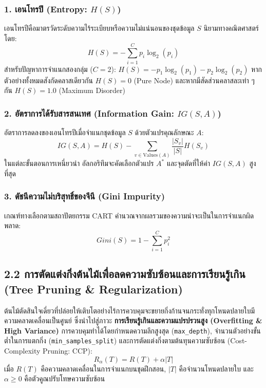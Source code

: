 \documentclass[12pt,a4paper]{article}
\begin{document}
\subsubsection*{1. เอนโทรปี (Entropy: $H(S)$)}
เอนโทรปีคือมาตรวัดระดับความไร้ระเบียบหรือความไม่แน่นอนของชุดข้อมูล $S$ นิยามทางคณิตศาสตร์โดย:
\begin{equation}
    H(S) = -\sum_{i=1}^{C} p_i \log_2(p_i)
\end{equation}
สำหรับปัญหาการจำแนกสองกลุ่ม ($C = 2$): $H(S) = -p_1 \log_2(p_1) - p_2 \log_2(p_2)$ หากตัวอย่างทั้งหมดสังกัดคลาสเดียวกัน $H(S) = 0$ (Pure Node) และหากมีสัดส่วนคลาสละเท่า ๆ กัน $H(S) = 1.0$ (Maximum Disorder)

\subsubsection*{2. อัตราการได้รับสารสนเทศ (Information Gain: $IG(S, A)$)}
อัตราการลดลงของเอนโทรปีเมื่อจำแนกชุดข้อมูล $S$ ด้วยตัวแปรคุณลักษณะ $A$:
\begin{equation}
    IG(S, A) = H(S) - \sum_{v \in \text{Values}(A)} \frac{|S_v|}{|S|} H(S_v)
\end{equation}
ในแต่ละขั้นตอนการเหนี่ยวนำ อัลกอริทึมจะคัดเลือกตัวแปร $A^*$ และจุดตัดที่ให้ค่า $IG(S, A)$ สูงที่สุด

\subsubsection*{3. ดัชนีความไม่บริสุทธิ์ของจีนี (Gini Impurity)}
เกณฑ์ทางเลือกตามสถาปัตยกรรม CART คำนวณจากผลรวมของความน่าจะเป็นในการจำแนกผิดพลาด:
\begin{equation}
    Gini(S) = 1 - \sum_{i=1}^{C} p_i^2
\end{equation}

\subsection*{2.2 การตัดแต่งกิ่งต้นไม้เพื่อลดความซับซ้อนและการเรียนรู้เกิน\\ \normalsize(Tree Pruning \& Regularization)}
ต้นไม้ตัดสินใจเดี่ยวที่ปล่อยให้เติบโตอย่างไร้การควบคุมจะขยายกิ่งก้านจนกระทั่งทุกโหนดปลายใบมีความคลาดเคลื่อนเป็นศูนย์ ซึ่งนำไปสู่ภาวะ \textbf{การเรียนรู้เกินและความแปรปรวนสูง (Overfitting \& High Variance)} การควบคุมทำได้โดยกำหนดความลึกสูงสุด (\texttt{max\_depth}), จำนวนตัวอย่างขั้นต่ำในการแตกกิ่ง (\texttt{min\_samples\_split}) และการตัดแต่งกิ่งตามต้นทุนความซับซ้อน (Cost-Complexity Pruning: CCP):
\begin{equation}
    R_\alpha(T) = R(T) + \alpha |T|
\end{equation}
เมื่อ $R(T)$ คือความคลาดเคลื่อนในการจำแนกบนชุดฝึกสอน, $|T|$ คือจำนวนโหนดปลายใบ และ $\alpha \ge 0$ คือตัวคูณปรับโทษความซับซ้อน
\end{document}
